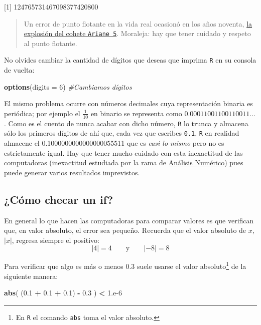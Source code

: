 \documentclass[
]{book}
\newenvironment{Shaded}{\begin{snugshade}}{\end{snugshade}}
\newcommand{\CommentTok}[1]{\textcolor[rgb]{0.56,0.35,0.01}{\textit{#1}}}
\newcommand{\DataTypeTok}[1]{\textcolor[rgb]{0.13,0.29,0.53}{#1}}
\newcommand{\DecValTok}[1]{\textcolor[rgb]{0.00,0.00,0.81}{#1}}
\newcommand{\FloatTok}[1]{\textcolor[rgb]{0.00,0.00,0.81}{#1}}
\newcommand{\KeywordTok}[1]{\textcolor[rgb]{0.13,0.29,0.53}{\textbf{#1}}}
\newcommand{\NormalTok}[1]{#1}
\newcommand{\OperatorTok}[1]{\textcolor[rgb]{0.81,0.36,0.00}{\textbf{#1}}}
\newcommand{\StringTok}[1]{\textcolor[rgb]{0.31,0.60,0.02}{#1}}
\begin{document}
{[}1{]} 124765731467098377420800

\begin{quote}
Un error de punto flotante en la vida real ocasionó en los años noventa, \href{https://www.esa.int/Newsroom/Press_Releases/Ariane_501_-_Presentation_of_Inquiry_Board_report}{la explosión del cohete \texttt{Ariane\ 5}}. Moraleja: hay que tener cuidado y respeto al punto flotante.
\end{quote}

No olvides cambiar la cantidad de dígitos que deseas que imprima \texttt{R} en su consola de vuelta:

\begin{Shaded}
\begin{Highlighting}[]
\KeywordTok{options}\NormalTok{(}\DataTypeTok{digits =} \DecValTok{6}\NormalTok{) }\CommentTok{#Cambiamos dígitos}
\end{Highlighting}
\end{Shaded}

El mismo problema ocurre con números decimales cuya representación binaria es periódica; por ejemplo el \(\frac{1}{10}\) en binario se representa como \(0.0001100110011\overline{0011}\dots\). Como es el cuento de nunca acabar con dicho número, \texttt{R} lo trunca y almacena sólo los primeros dígitos de ahí que, cada vez que escribes \texttt{0.1}, \texttt{R} en realidad almacene el 0.1000000000000000055511 que es \emph{casi lo mismo} pero no es estrictamente igual. Hay que tener mucho cuidado con esta inexactitud de las computadoras (inexactitud estudiada por la rama de \href{https://www.springer.com/gp/book/9781461484523}{Análisis Numérico}) pues puede generar varios resultados imprevistos.

\hypertarget{cuxf3mo-checar-un-if}{%
\subsection{¿Cómo checar un if?}\label{cuxf3mo-checar-un-if}}

En general lo que hacen las computadoras para comparar valores es que verifican que, en valor absoluto, el error sea pequeño. Recuerda que el valor absoluto de \(x\), \(|x|\), regresa siempre el positivo:
\[
|4| = 4 \qquad \textrm{y} \qquad |-8| = 8
\]

Para verificar que algo es más o menos \(0.3\) suele usarse el valor absoluto\footnote{En \texttt{R} el comando \texttt{abs} toma el valor absoluto.} de la siguiente manera:

\begin{Shaded}
\begin{Highlighting}[]
\KeywordTok{abs}\NormalTok{( (}\FloatTok{0.1} \OperatorTok{+}\StringTok{ }\FloatTok{0.1} \OperatorTok{+}\StringTok{ }\FloatTok{0.1}\NormalTok{) }\OperatorTok{-}\StringTok{ }\FloatTok{0.3}\NormalTok{ ) }\OperatorTok{<}\StringTok{ }\DecValTok{1}\NormalTok{.e}\DecValTok{-6}
\end{Highlighting}
\end{Shaded}
\end{document}
